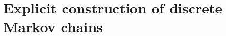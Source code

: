 \documentclass[10pt]{book}
\begin{document}



\begin{namedthm}
    
\end{namedthm}



\section{Explicit construction of discrete Markov chains}
\end{document}
